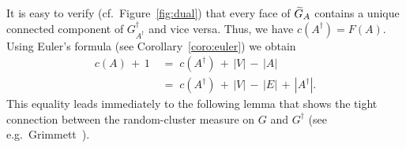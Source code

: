 \documentclass{dis}
\theoremstyle{citing}
\begin{document}
It is easy to verify (cf.~Figure~\ref{fig:dual}) that 
every face of ${\,\raisebox{2pt}{ ${\widetilde{{}}}$ }\mkern-15mu G}_A$ contains a unique connected component of 
$G^\dag_{A^\dag}$ and vice versa.
Thus, we have $c(A^\dag)=F(A)$.
Using Euler's formula (see Corollary~\ref{coro:euler}) we obtain 
\begin{equation}\label{eq:dual-components}
\begin{split}
c(A) \,+\, 1 \;&=\; c(A^\dag) \,+\, {\left\vert {V} \right\vert} \,-\, {\left\vert {A} \right\vert}  \\
\;&=\; c(A^\dag) \,+\, {\left\vert {V} \right\vert} \,-\, {\left\vert {E} \right\vert} \,+\, {\left\vert {A^\dag} \right\vert}.
\end{split}
\end{equation}
This equality leads immediately to the following lemma that 
shows the tight connection between the random-cluster measure 
on $G$ and $G^\dag$ (see e.g.~Grimmett~\cite[eq.~(6.4)]{G1}). 
\end{document}
